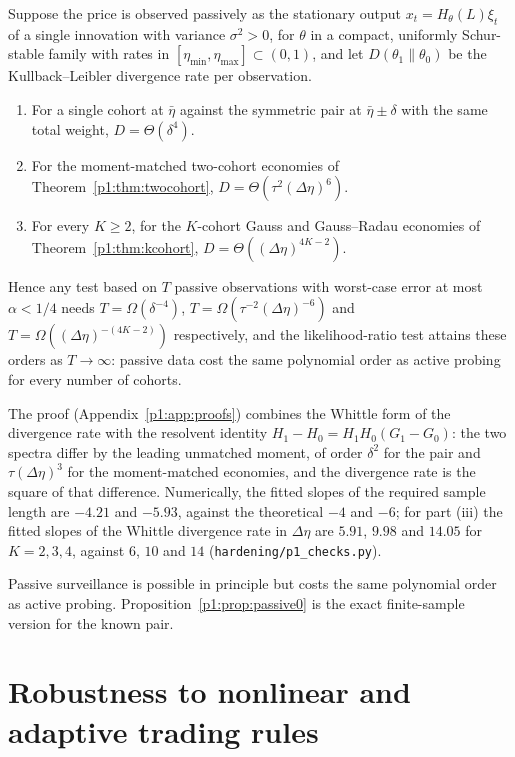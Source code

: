 \begin{theorem}\label{p1:prop:passive}
Suppose the price is observed passively as the stationary output $x_t=H_\theta(L)\xi_t$ of a single innovation with variance $\sigma^2>0$, for $\theta$ in a compact, uniformly Schur-stable family with rates in $[\eta_{\min},\eta_{\max}]\subset(0,1)$, and let $D(\theta_1\|\theta_0)$ be the Kullback--Leibler divergence rate per observation.
\begin{enumerate}[label=(\roman*)]
\item For a single cohort at $\bar\eta$ against the symmetric pair at $\bar\eta\pm\delta$ with the same total weight, $D=\Theta(\delta^4)$.
\item For the moment-matched two-cohort economies of Theorem~\ref{p1:thm:twocohort}, $D=\Theta(\tau^2(\Delta\eta)^6)$.
\item For every $K\ge2$, for the $K$-cohort Gauss and Gauss--Radau economies of Theorem~\ref{p1:thm:kcohort}, $D=\Theta((\Delta\eta)^{4K-2})$.
\end{enumerate}
Hence any test based on $T$ passive observations with worst-case error at most $\alpha<1/4$ needs $T=\Omega(\delta^{-4})$, $T=\Omega(\tau^{-2}(\Delta\eta)^{-6})$ and $T=\Omega((\Delta\eta)^{-(4K-2)})$ respectively, and the likelihood-ratio test attains these orders as $T\to\infty$: passive data cost the same polynomial order as active probing for every number of cohorts.
\end{theorem}

The proof (Appendix~\ref{p1:app:proofs}) combines the Whittle form of the divergence rate with the resolvent identity $H_1-H_0=H_1H_0(G_1-G_0)$: the two spectra differ by the leading unmatched moment, of order $\delta^2$ for the pair and $\tau(\Delta\eta)^3$ for the moment-matched economies, and the divergence rate is the square of that difference. Numerically, the fitted slopes of the required sample length are $-4.21$ and $-5.93$, against the theoretical $-4$ and $-6$; for part (iii) the fitted slopes of the Whittle divergence rate in $\Delta\eta$ are $5.91$, $9.98$ and $14.05$ for $K=2,3,4$, against $6$, $10$ and $14$ (\texttt{hardening/p1\_checks.py}).

Passive surveillance is possible in principle but costs the same polynomial order as active probing. Proposition~\ref{p1:prop:passive0} is the exact finite-sample version for the known pair.

\section{Robustness to nonlinear and adaptive trading rules}\label{p1:sec:learners}

